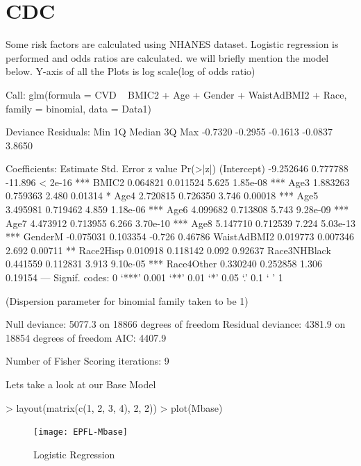\documentclass{report}
\begin{document}
\newpage
\section{\color{blue}CDC}
Some risk factors are calculated using NHANES dataset. Logistic regression is performed and odds ratios are calculated. 
we will briefly mention the model below.
{\color{red} Y-axis of all the Plots is log scale(log of odds ratio)}
\begin{Schunk}
\begin{Soutput}
Call:
glm(formula = CVD ~ BMIC2 + Age + Gender + WaistAdBMI2 + Race, 
    family = binomial, data = Data1)

Deviance Residuals: 
    Min       1Q   Median       3Q      Max  
-0.7320  -0.2955  -0.1613  -0.0837   3.8650  

Coefficients:
              Estimate Std. Error z value Pr(>|z|)    
(Intercept)  -9.252646   0.777788 -11.896  < 2e-16 ***
BMIC2         0.064821   0.011524   5.625 1.85e-08 ***
Age3          1.883263   0.759363   2.480  0.01314 *  
Age4          2.720815   0.726350   3.746  0.00018 ***
Age5          3.495981   0.719462   4.859 1.18e-06 ***
Age6          4.099682   0.713808   5.743 9.28e-09 ***
Age7          4.473912   0.713955   6.266 3.70e-10 ***
Age8          5.147710   0.712539   7.224 5.03e-13 ***
GenderM      -0.075031   0.103354  -0.726  0.46786    
WaistAdBMI2   0.019773   0.007346   2.692  0.00711 ** 
Race2Hisp     0.010918   0.118142   0.092  0.92637    
Race3NHBlack  0.441559   0.112831   3.913 9.10e-05 ***
Race4Other    0.330240   0.252858   1.306  0.19154    
---
Signif. codes:  0 ‘***’ 0.001 ‘**’ 0.01 ‘*’ 0.05 ‘.’ 0.1 ‘ ’ 1 

(Dispersion parameter for binomial family taken to be 1)

    Null deviance: 5077.3  on 18866  degrees of freedom
Residual deviance: 4381.9  on 18854  degrees of freedom
AIC: 4407.9

Number of Fisher Scoring iterations: 9
\end{Soutput}
\end{Schunk}
\newpage
Lets take a look at our Base Model 
\begin{Schunk}
\begin{Sinput}
> layout(matrix(c(1, 2, 3, 4), 2, 2))
> plot(Mbase)
\end{Sinput}
\end{Schunk}
\begin{figure}[H]
\centering
\texttt{[image: EPFL-Mbase]}
\caption{Logistic Regression}
\end{figure}
\end{document}

